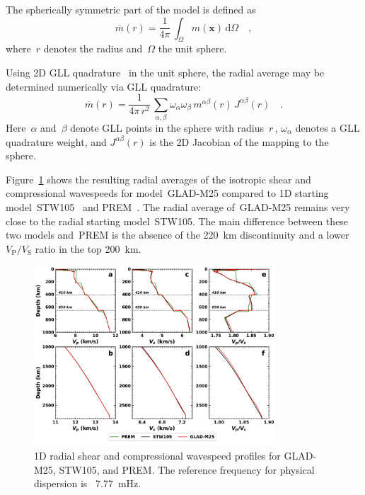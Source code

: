 The spherically symmetric part of the model is defined as
\begin{equation}
    \overline{m}(r)=\frac{1}{4\pi}\,\int_\Omega m(\mathbf{x})\,\mathrm{d} \Omega
    \quad,
\end{equation}
where~$r$ denotes the radius and~$\Omega$ the unit sphere.

Using 2D GLL quadrature~\cite{KoTr99} in the unit sphere,
the radial average may be determined numerically via GLL quadrature:
\begin{equation}
    \overline{m}(r)=\frac{1}{4\pi\,r^2}\,\sum_{\alpha,\beta}\omega_\alpha\omega_\beta\,m^{\alpha\beta}(r)\,J^{\alpha\beta}(r)
    \quad.
    \label{eq:radial_average}
\end{equation}
Here~$\alpha$ and~$\beta$ denote GLL points in the sphere with radius~$r$\,,
$\omega_\alpha$ denotes a GLL quadrature weight, and $J^{\alpha\beta}(r)$ is the 2D Jacobian of the mapping to the sphere.

Figure~\ref{fig:global-average} shows the resulting radial averages of the isotropic shear and compressional wavespeeds for model~GLAD-M25
compared to 1D starting model~STW105~\cite{kustowski2008anisotropic} and PREM~\cite{PREM}.
The radial average of~GLAD-M25 remains very close to the radial starting model~STW105.
The main difference between these two models and~PREM
is the absence of the 220~km discontinuity and a lower~$V_\text{P}/V_\text{S}$ ratio in the top 200~km.

\begin{figure}
  \centering
  \includegraphics[width=0.8\textwidth]{ch-GLADM25/figures/1d_profile.pdf}
  \caption{\small{1D radial shear and compressional wavespeed profiles for GLAD-M25, STW105, and PREM.
  The reference frequency for physical dispersion is ~7.77~mHz.}}
  \label{fig:global-average}
\end{figure}

